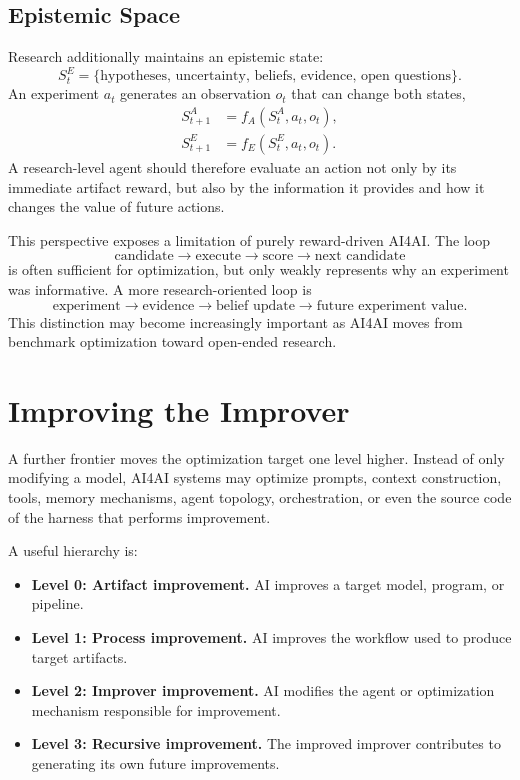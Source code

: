 \documentclass[journal]{IEEEtran}
\begin{document}
\subsection{Epistemic Space}
Research additionally maintains an epistemic state:
\begin{equation*}
S_t^{E}=\{\text{hypotheses, uncertainty, beliefs, evidence, open questions}\}.
\end{equation*}
An experiment $a_t$ generates an observation $o_t$ that can change both states,
\begin{align}
S_{t+1}^{A} &= f_A(S_t^{A},a_t,o_t),\\
S_{t+1}^{E} &= f_E(S_t^{E},a_t,o_t).
\end{align}
A research-level agent should therefore evaluate an action not only by its immediate artifact reward, but also by the information it provides and how it changes the value of future actions.

This perspective exposes a limitation of purely reward-driven AI4AI. The loop
\begin{equation*}
\text{candidate}\rightarrow\text{execute}\rightarrow\text{score}\rightarrow\text{next candidate}
\end{equation*}
is often sufficient for optimization, but only weakly represents why an experiment was informative. A more research-oriented loop is
\begin{equation*}
\text{experiment}\rightarrow\text{evidence}\rightarrow\text{belief update}\rightarrow\text{future experiment value}.
\end{equation*}
This distinction may become increasingly important as AI4AI moves from benchmark optimization toward open-ended research.

\section{Improving the Improver}
\label{sec:improver}

A further frontier moves the optimization target one level higher. Instead of only modifying a model, AI4AI systems may optimize prompts, context construction, tools, memory mechanisms, agent topology, orchestration, or even the source code of the harness that performs improvement.

A useful hierarchy is:
\begin{itemize}[leftmargin=*]
    \item \textbf{Level 0: Artifact improvement.} AI improves a target model, program, or pipeline.
    \item \textbf{Level 1: Process improvement.} AI improves the workflow used to produce target artifacts.
    \item \textbf{Level 2: Improver improvement.} AI modifies the agent or optimization mechanism responsible for improvement.
    \item \textbf{Level 3: Recursive improvement.} The improved improver contributes to generating its own future improvements.
\end{itemize}
\end{document}
